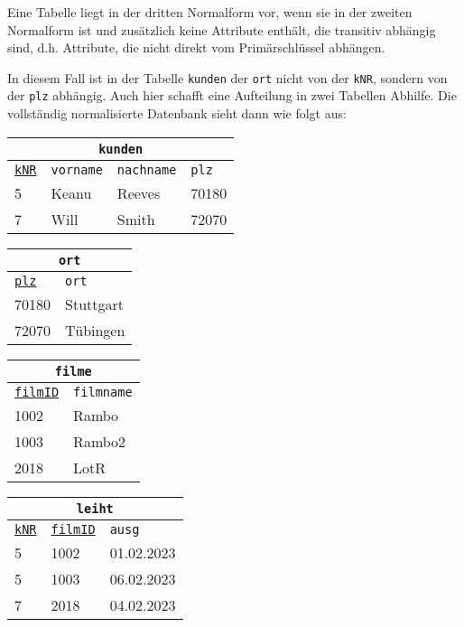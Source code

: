 \begin{tcolorbox}[title=Dritte Normalform]
	Eine Tabelle liegt in der dritten Normalform vor, wenn sie in der zweiten Normalform ist und zusätzlich keine Attribute enthält, die transitiv abhängig sind, d.h. Attribute, die nicht direkt vom Primärschlüssel abhängen.
\end{tcolorbox}
In diesem Fall ist in der Tabelle \lstinline!kunden! der \lstinline!ort! nicht von der \lstinline!kNR!, sondern von der \lstinline!plz! abhängig. Auch hier schafft eine Aufteilung in zwei Tabellen Abhilfe. Die vollständig normalisierte Datenbank sieht dann wie folgt aus:
\begin{minipage}{\textwidth}
	\begin{minipage}{0.4\textwidth}
		\begin{tabular}{llll}
			\multicolumn{4}{c}{\lstinline!kunden!}\\
			\hline
			\underline{\lstinline!kNR!}&\lstinline!vorname!&\lstinline!nachname!&\lstinline!plz!\\
			\hline
			5&Keanu&Reeves&70180\\
			7&Will&Smith&72070\\
		\end{tabular}
	\end{minipage}
	\begin{minipage}{0.25\textwidth}
		\begin{tabular}{ll}
			\multicolumn{2}{c}{\lstinline!ort!}\\
			\hline
			\underline{\lstinline!plz!}&\lstinline!ort!\\
			\hline
			70180&Stuttgart\\
			72070&Tübingen\\
		\end{tabular}
	\end{minipage}
\end{minipage}
\begin{minipage}{0.4\textwidth}
	\begin{tabular}{ll}
		\multicolumn{2}{c}{\lstinline!filme!}\\
		\hline
		\underline{\lstinline!filmID!}&\lstinline!filmname!\\
		\hline
		1002&Rambo\\
		1003&Rambo2\\
		2018&LotR\\
	\end{tabular}
\end{minipage}
		\begin{minipage}{0.3\textwidth}
	\begin{tabular}{lll}
		\multicolumn{3}{c}{\lstinline!leiht!}\\
		\hline
		\underline{\lstinline!kNR!}&\underline{\lstinline!filmID!}&\lstinline!ausg!\\
		\hline
		5&1002&01.02.2023\\
		5&1003&06.02.2023\\
		7&2018&04.02.2023\\
	\end{tabular}
\end{minipage}

